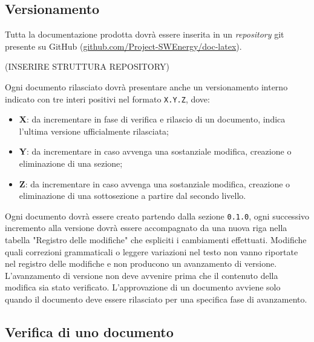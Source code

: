 \subsection{Versionamento}
Tutta la documentazione prodotta dovrà essere inserita in un \textit{repository} git presente su GitHub (\href{https://github.com/Project-SWEnergy/doc-latex/}{github.com/Project-SWEnergy/doc-latex}). 
\par
(INSERIRE STRUTTURA REPOSITORY) 
\par
Ogni documento rilasciato dovrà presentare anche un versionamento interno indicato con tre interi positivi nel formato \texttt{X.Y.Z}, dove:
\begin{itemize}
    \item \textbf{X}: da incrementare in fase di verifica e rilascio di un documento, indica l'ultima versione ufficialmente rilasciata;
    \item \textbf{Y}: da incrementare in caso avvenga una sostanziale modifica, creazione o eliminazione di una sezione;
    \item \textbf{Z}: da incrementare in caso avvenga una sostanziale modifica, creazione o eliminazione di una sottosezione a partire dal secondo livello.
\end{itemize}
Ogni documento dovrà essere creato partendo dalla sezione \texttt{0.1.0}, ogni successivo incremento alla versione dovrà essere accompagnato da una nuova riga nella tabella "Registro delle modifiche" che espliciti i cambiamenti effettuati.
Modifiche quali correzioni grammaticali o leggere variazioni nel testo non vanno riportate nel registro delle modifiche e non producono un avanzamento di versione.
L'avanzamento di versione non deve avvenire prima che il contenuto della modifica sia stato verificato.
L'approvazione di un documento avviene solo quando il documento deve essere rilasciato per una specifica fase di avanzamento.

\subsection{Verifica di uno documento}
